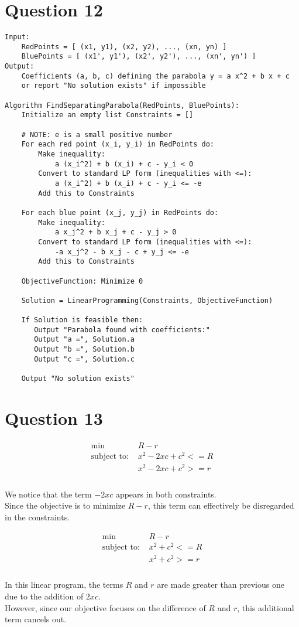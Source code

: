 \documentclass{article}
\begin{document}
\section*{Question 12}
\begin{verbatim}
Input: 
    RedPoints = [ (x1, y1), (x2, y2), ..., (xn, yn) ]
    BluePoints = [ (x1', y1'), (x2', y2'), ..., (xn', yn') ]
Output:
    Coefficients (a, b, c) defining the parabola y = a x^2 + b x + c
    or report "No solution exists" if impossible

Algorithm FindSeparatingParabola(RedPoints, BluePoints): 
    Initialize an empty list Constraints = []

    # NOTE: e is a small positive number
    For each red point (x_i, y_i) in RedPoints do:
        Make inequality:
            a (x_i^2) + b (x_i) + c - y_i < 0
        Convert to standard LP form (inequalities with <=):
            a (x_i^2) + b (x_i) + c - y_i <= -e
        Add this to Constraints

    For each blue point (x_j, y_j) in RedPoints do:
        Make inequality:
            a x_j^2 + b x_j + c - y_j > 0
        Convert to standard LP form (inequalities with <=):
            -a x_j^2 - b x_j - c + y_j <= -e
        Add this to Constraints

    ObjectiveFunction: Minimize 0

    Solution = LinearProgramming(Constraints, ObjectiveFunction)

    If Solution is feasible then:
       Output "Parabola found with coefficients:"
       Output "a =", Solution.a
       Output "b =", Solution.b
       Output "c =", Solution.c

    Output "No solution exists"
\end{verbatim}

\newpage

\section*{Question 13}
\begin{align*}
    \text{min } & R - r \\
    \text{subject to: } & x^2 - 2xc + c^2 <= R \\
                        & x^2 - 2xc + c^2 >= r \\
\end{align*}
\\
We notice that the term $-2xc$ appears in both constraints. \\
Since the objective is to minimize $R - r$, this term can effectively be disregarded in the constraints.
    
\begin{align*}
    \text{min } & R - r \\
    \text{subject to: } & x^2 + c^2 <= R \\
                        & x^2 + c^2 >= r \\
\end{align*}
\\
In this linear program, the terms $R$ and $r$ are made greater than previous one due to the addition of $2xc$. \\
However, since our objective focuses on the difference of $R$ and $r$, this additional term cancels out.
\end{document}
